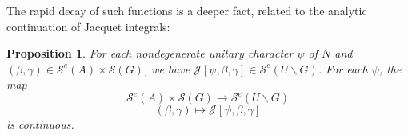 \documentclass[reqno]{amsart}
\theoremstyle{plain} \newtheorem{theorem} {Theorem}
\newtheorem{proposition} [theorem] {Proposition}
\theoremstyle{definition} \newtheorem{definition} [theorem] {Definition}
\theoremstyle{itplain} %
\numberwithin{equation}{section}
\numberwithin{theorem}{section}
\begin{document}
The rapid decay of such functions is a deeper fact, related to the analytic continuation of Jacquet integrals:
\begin{proposition}\label{lem:sub-gln:each-psi-beta}
  For each nondegenerate unitary character $\psi$ of $N$ and $(\beta,\gamma) \in \mathcal{S}^e(A) \times \mathcal{S}(G)$, we have $\mathcal{J}[\psi,\beta,\gamma] \in \mathcal{S}^e(U \backslash G)$.  For each $\psi$, the map
  \begin{equation*}
    \mathcal{S}^e(A) \times \mathcal{S}(G) \rightarrow \mathcal{S}^e(U \backslash G)
  \end{equation*}
  \begin{equation}\label{eq:beta-gamma-mapsto}
    (\beta,\gamma) \mapsto \mathcal{J}[\psi,\beta,\gamma]
  \end{equation}
  is continuous.
\end{proposition}
\end{document}
